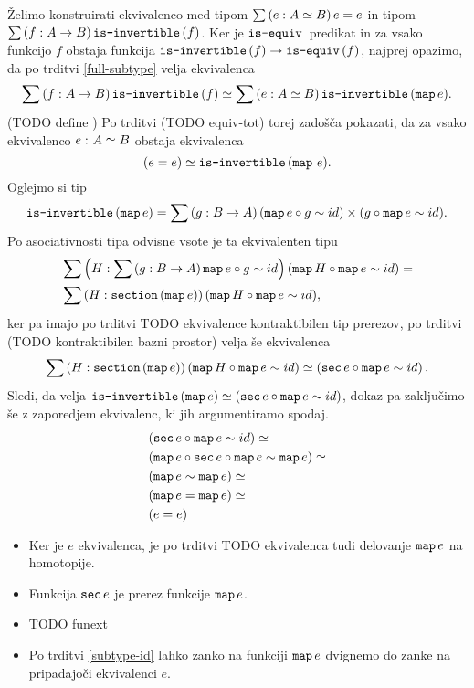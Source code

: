 \begin{dokaz}
  Želimo konstruirati ekvivalenco med tipom \(\sumtype{e}{A \simeq B}{e = e}\) in tipom
  \(\sumtype{f}{A \to B}{\isinv(f)}\).
  Ker je \(\isequiv\) predikat in za vsako funkcijo \(f\) obstaja funkcija
  \(\typename{is-invertible}(f) \to \typename{is-equiv}(f)\), najprej opazimo, da po
  trditvi \ref{full-subtype} velja ekvivalenca
  \[\sumtype{f}{A \to B}{\isinv(f)} \simeq
    \sumtype{e}{A \simeq B}{\isinv(\map e).}
  \]
  (TODO define \map) Po trditvi (TODO equiv-tot)
  torej zadošča pokazati, da za vsako ekvivalenco \(\dequiv{e}{A}{B}\) obstaja ekvivalenca
  \[(e = e) \simeq \isinv(\map \, e).\]
  Oglejmo si tip \[\isinv(\map e) = \sumtype{g}{B \to A}{(\map e \circ g \sim id) \times (g \circ \map e \sim id)}.\] Po
  asociativnosti tipa odvisne vsote je ta ekvivalenten tipu
  \begin{align*}
    & \sumtype{H}{\sumtype{g}{B \to A}{\map e \circ g \sim id}}{(\map H \circ \map e \sim id)} = \\
    & \sumtype{H}{\typename{section}(\map e)}{(\map H \circ \map e \sim id)},
  \end{align*}
  ker pa imajo po trditvi TODO ekvivalence kontraktibilen tip prerezov, po trditvi
  (TODO kontraktibilen bazni prostor) velja še ekvivalenca
  \[\sumtype{H}{\typename{section}(\map e)}{(\map H \circ \map e \sim id)} \simeq
    \left(\typename{sec} e \circ \map e \sim id\right).\]
  Sledi, da velja \(\isinv(\map e) \simeq (\typename{sec} e \circ \map e \sim id)\), dokaz pa
  zaključimo še z zaporedjem ekvivalenc, ki jih argumentiramo spodaj.
  \begin{align*}
    & (\typename{sec} e \circ \map e \sim id) \simeq \\
    & (\map e \circ \typename{sec}e \circ \map e \sim \map e) \simeq \\
    & (\map e \sim \map e) \simeq \\
    & (\map e = \map e) \simeq \\
    & (e = e)
  \end{align*}
  \begin{itemize}
  \item Ker je \(e\) ekvivalenca, je po trditvi TODO ekvivalenca tudi delovanje \(\map e\)
    na homotopije.
  \item Funkcija \(\typename{sec}e\) je prerez funkcije \(\map e\).
  \item TODO funext
  \item Po trditvi \ref{subtype-id} lahko zanko na funkciji \(\map e\) dvignemo do
    zanke na pripadajoči ekvivalenci \(e\).
  \end{itemize}
\end{dokaz}


